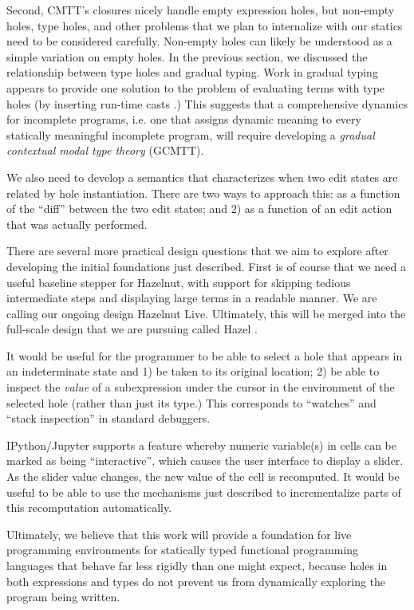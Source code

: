 Second, CMTT's closures nicely handle empty expression holes, but non-empty holes, type holes, and other problems that we plan to internalize with our statics need to be considered carefully. Non-empty holes can likely be understood as a simple variation on empty holes. In the previous section, we discussed the relationship between type holes and gradual typing. Work in gradual typing appears to provide one solution to the problem of evaluating terms with type holes (by inserting run-time casts \cite{Siek06a}.) This suggests that a comprehensive dynamics for incomplete programs, i.e. one that assigns dynamic meaning to every statically meaningful incomplete program, will require developing a \emph{gradual contextual modal type theory} (GCMTT).

We also need to develop a semantics that characterizes when two edit states are related by hole instantiation. There are two ways to approach this: as a function of the ``diff'' between the two edit states; and 2) as a function of an edit action that was actually performed.

There are several more practical design questions that we aim to explore after developing the initial foundations just described. First is of course that we need a useful baseline stepper for Hazelnut, with support for skipping tedious intermediate steps and displaying large terms in a readable manner. We are calling our ongoing design Hazelnut Live. Ultimately, this will be merged into the full-scale design that we are pursuing called Hazel \cite{snapl17-paper}.

It would be useful for the programmer to be able to select a hole that appears in an indeterminate state and 1) be taken to its original location; 2) be able to inspect the \emph{value} of a subexpression under the cursor in the environment of the selected hole (rather than just its type.) This corresponds to ``watches'' and ``stack inspection'' in standard debuggers.

IPython/Jupyter \cite{Perez:2007:ISI:1251563.1251831} supports a feature whereby numeric variable(s) in cells can be marked as being ``interactive'', which causes the user interface to display a slider. As the slider value changes, the new value of the cell is recomputed. It would be useful to be able to use the mechanisms just described to incrementalize parts of this recomputation automatically.

Ultimately, we believe that this work will provide a foundation for live programming environments for statically typed functional programming languages that behave far less rigidly than one might expect, because holes in both expressions and types do not prevent us from dynamically exploring the program being written.